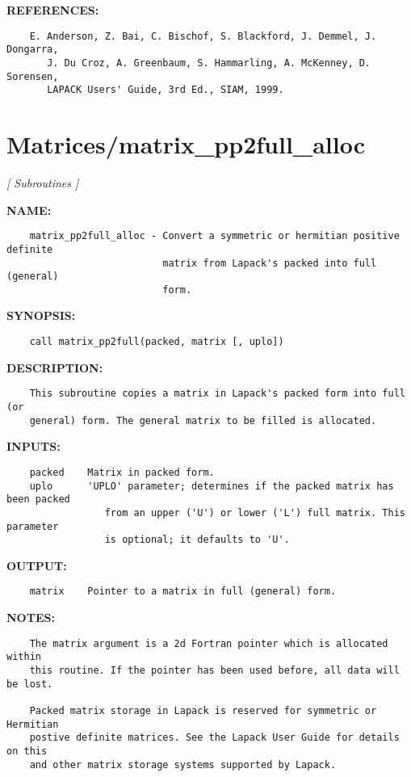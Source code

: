 \textbf{REFERENCES:}\hspace{0.08in}\begin{Verbatim}
    E. Anderson, Z. Bai, C. Bischof, S. Blackford, J. Demmel, J. Dongarra,
       J. Du Croz, A. Greenbaum, S. Hammarling, A. McKenney, D. Sorensen,
       LAPACK Users' Guide, 3rd Ed., SIAM, 1999.
\end{Verbatim}
\section{Matrices/matrix\_pp2full\_alloc}
\textsl{[ Subroutines ]}

\label{ch:robo23}
\label{ch:Matrices_matrix_pp2full_alloc}
\textbf{NAME:}\hspace{0.08in}\begin{Verbatim}
    matrix_pp2full_alloc - Convert a symmetric or hermitian positive definite
                           matrix from Lapack's packed into full (general)
                           form.
\end{Verbatim}
\textbf{SYNOPSIS:}\hspace{0.08in}\begin{Verbatim}
    call matrix_pp2full(packed, matrix [, uplo])
\end{Verbatim}
\textbf{DESCRIPTION:}\hspace{0.08in}\begin{Verbatim}
    This subroutine copies a matrix in Lapack's packed form into full (or 
    general) form. The general matrix to be filled is allocated.
\end{Verbatim}
\textbf{INPUTS:}\hspace{0.08in}\begin{Verbatim}
    packed    Matrix in packed form.
    uplo      'UPLO' parameter; determines if the packed matrix has been packed
                 from an upper ('U') or lower ('L') full matrix. This parameter
                 is optional; it defaults to 'U'.
\end{Verbatim}
\textbf{OUTPUT:}\hspace{0.08in}\begin{Verbatim}
    matrix    Pointer to a matrix in full (general) form.
\end{Verbatim}
\textbf{NOTES:}\hspace{0.08in}\begin{Verbatim}
    The matrix argument is a 2d Fortran pointer which is allocated within
    this routine. If the pointer has been used before, all data will be lost.

    Packed matrix storage in Lapack is reserved for symmetric or Hermitian
    postive definite matrices. See the Lapack User Guide for details on this
    and other matrix storage systems supported by Lapack. 
\end{Verbatim}
